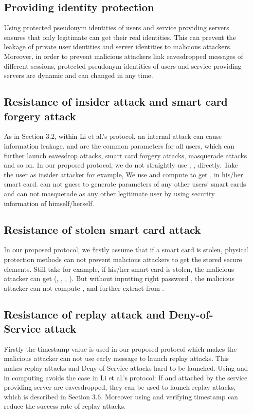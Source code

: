 \documentclass[preprint,12pt]{elsarticle}
\begin{document}
\subsection{Providing identity protection}
Using protected pseudonym identities of users and service providing servers ensures that only legitimate  can get their real identities. This can prevent the leakage of private user identities and server identities to malicious attackers. Moreover, in order to prevent malicious attackers link eavesdropped messages of different sessions, protected pseudonym identities of users and service providing servers are dynamic and can changed in any time.

\subsection{Resistance of insider attack and smart card forgery attack}
As in Section 3.2, within Li et al.'s protocol, an internal attack can cause information leakage.  and  are the common parameters for all users, which can further launch eavesdrop attacks, smart card forgery attacks, masquerade attacks and so on. In our proposed protocol, we do not straightly use , ,  directly. Take the user  as insider attacker for example, We use  and compute to get ,  in his/her smart card.  can not guess to generate parameters of any other users' smart cards and can not masquerade as any other legitimate user by using security information of himself/herself.

\subsection{Resistance of stolen smart card attack}
In our proposed protocol, we firstly assume that if a smart card is stolen, physical protection methods can not prevent malicious attackers to get the stored secure elements. Still take  for example, if his/her smart card is stolen, the malicious attacker can get (, , , ). But without inputting right password , the malicious attacker can not compute , and further extract  from .

\subsection{Resistance of replay attack and Deny-of-Service attack}
Firstly the timestamp value is used in our proposed protocol which makes the malicious attacker can not use early message to launch replay attacks. This makes replay attacks and Deny-of-Service attacks hard to be launched. Using  and  in computing  avoids the case in Li et al.'s protocol: If  and  attached by the service providing server  are eavesdropped, they can be used to launch replay attacks, which is described in Section 3.6. Moreover using and verifying timestamp can reduce the success rate of replay attacks.
\end{document}

